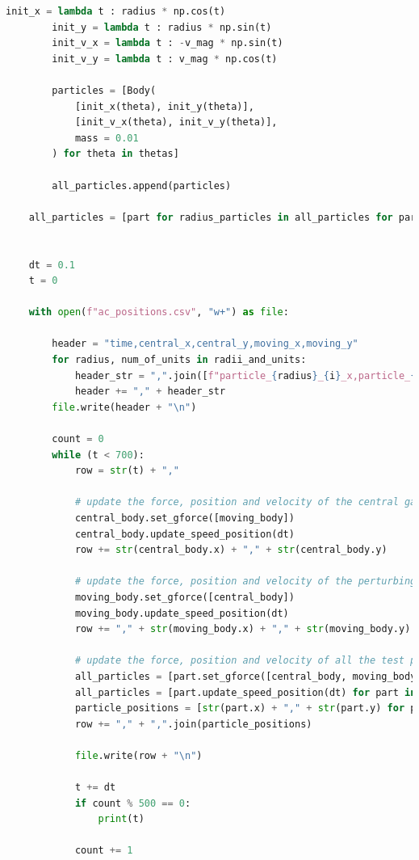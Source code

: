 \documentclass[twoside,twocolumn]{article}
\begin{document}
\begin{lstlisting}[language=Python, breaklines=true]
        init_x = lambda t : radius * np.cos(t)
        init_y = lambda t : radius * np.sin(t)
        init_v_x = lambda t : -v_mag * np.sin(t)
        init_v_y = lambda t : v_mag * np.cos(t)

        particles = [Body(
            [init_x(theta), init_y(theta)],
            [init_v_x(theta), init_v_y(theta)], 
            mass = 0.01 
        ) for theta in thetas]

        all_particles.append(particles)

    all_particles = [part for radius_particles in all_particles for part in radius_particles]


    dt = 0.1
    t = 0

    with open(f"ac_positions.csv", "w+") as file:

        header = "time,central_x,central_y,moving_x,moving_y"
        for radius, num_of_units in radii_and_units:
            header_str = ",".join([f"particle_{radius}_{i}_x,particle_{radius}_{i}_y" for i in range(num_of_units)])
            header += "," + header_str
        file.write(header + "\n")

        count = 0
        while (t < 700):
            row = str(t) + ","
            
            # update the force, position and velocity of the central galaxy
            central_body.set_gforce([moving_body])
            central_body.update_speed_position(dt)
            row += str(central_body.x) + "," + str(central_body.y)
            
            # update the force, position and velocity of the perturbing galaxy
            moving_body.set_gforce([central_body])
            moving_body.update_speed_position(dt)
            row += "," + str(moving_body.x) + "," + str(moving_body.y)

            # update the force, position and velocity of all the test particles
            all_particles = [part.set_gforce([central_body, moving_body]) for part in all_particles]
            all_particles = [part.update_speed_position(dt) for part in all_particles]
            particle_positions = [str(part.x) + "," + str(part.y) for part in all_particles]
            row += "," + ",".join(particle_positions)

            file.write(row + "\n")

            t += dt
            if count % 500 == 0:
                print(t)

            count += 1
    
\end{lstlisting}
\end{document}
